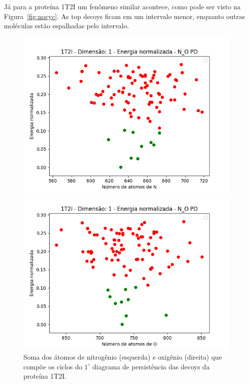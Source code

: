 Já para a proteína 1T2I um fenômeno similar acontece, como pode ser visto na Figura~\ref{fig:nocyc}. As top decoys
ficam em um intervalo menor, enquanto outras moléculas estão espalhadas pelo intervalo.
\begin{figure}[!htbp]
    \centering
    \begin{minipage}{0.45\textwidth}
        \centering
        \includegraphics[width=1.1\textwidth]{beamer/images/cyc1t2iN.png} %
    \end{minipage}\hfill
    \begin{minipage}{0.45\textwidth}
        \centering
        \includegraphics[width=1.1\textwidth]{beamer/images/cyc1t2iO.png} %
    \end{minipage}
    \caption{Soma dos átomos de nitrogênio (esquerda) e oxigênio (direita) que compõe os ciclos do 
    $1^\circ$ diagrama de persistência das decoys da proteína 1T2I.}
    \fautor    
\end{figure}


